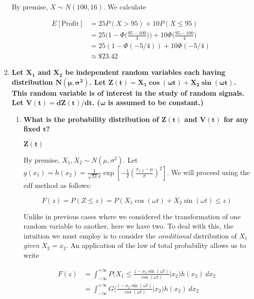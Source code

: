 \documentclass[10pt, oneside]{article}   	%
\theoremstyle{definition}
\begin{document}
\begin{enumerate}[label=9.\arabic*]
By premise, $X \sim N(100,16)$. We calculate

\begin{align*}
E[\text{Profit}] &= 25 P(X > 95) + 10 P(X \leq 95) \\
&= 25 \bigg(1 - \Phi \bigg( \frac{95-100}{4} \bigg) \bigg) + 10 \Phi \bigg( \frac{95-100}{4} \bigg) \\
&= 25 (1 - \Phi(-5/4)) + 10 \Phi(-5/4) \\
&\approx \boxed{\$ 23.42}
\end{align*}

\item  \begin{tcolorbox}[
  colback=Cerulean!5!white,
  colframe=Cerulean!75!black]
\textbf{Let $\bm{X_1}$ and $\bm{X_2}$ be independent random variables each having distribution $\bm{N(\mu, \sigma^2)}$. Let $\bm{Z(t) = X_1 \cos (\omega t) + X_2 \sin (\omega t)}$. This random variable is of interest in the study of random signals. Let $\bm{V(t) = dZ(t)/dt}$. ($\bm{\omega}$ is assumed to be constant.)}
\end{tcolorbox}

	\begin{enumerate}
	\item  \begin{tcolorbox}[
	  colback=Cerulean!5!white,
	  colframe=Cerulean!75!black]
	\textbf{What is the probability distribution of $\bm{Z(t)}$ and $\bm{V(t)}$ for any fixed $\bm{t}$?}
	\end{tcolorbox}
	
	$\bm{Z(t)}$
	
	By premise, $X_1, X_2 \sim N(\mu, \sigma^2)$. Let $g(x_1) = h(x_2) = \frac{1}{\sqrt{2 \pi} \sigma} \exp[-\frac{1}{2} (\frac{x_{1,2} - \mu}{\sigma})^2]$. We will proceed using the cdf method as follows:
	
	\[ F(z) = P(Z \leq z) = P(X_1 \cos(\omega t) + X_2 \sin(\omega t) \leq z) \]
	
	Unlike in previous cases where we considered the transformation of one random variable to another, here we have two. To deal with this, the intuition we must employ is to consider the \textit{conditional} distribution of $X_1$ \textit{given} $X_2 = x_2$. An application of the law of total probability allows us to write
	
	\begin{align*}
	F(z) &= \int^{+\infty}_{-\infty} P \bigg( X_1 \leq \frac{z - x_2 \sin (\omega t) }{\cos (\omega t)} \bigg| x_2 \bigg) h(x_2) \ dx_2 \\
	&= \int^{+\infty}_{-\infty} G \bigg( \frac{z - x_2 \sin (\omega t) }{\cos (\omega t)} \bigg| x_2 \bigg) h(x_2) \ dx_2
	\end{align*}
	

\end{enumerate}
\end{enumerate}
\end{document}
